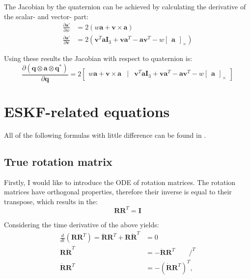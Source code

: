 The Jacobian by the quaternion can be achieved by calculating the derivative of the scalar- and vector- part:
\begin{equation}
\begin{aligned}
    \frac{\partial\mathbf{a}'}{\partial w}&=2(w\mathbf{a}+\mathbf{v}\times\mathbf{a}) \\
    \frac{\partial\mathbf{a}'}{\partial \mathbf{v}}&=2(\mathbf{v}^T\mathbf{a}\mathbf{I}_3+\mathbf{v}\mathbf{a}^T-\mathbf{a}\mathbf{v}^T-w\begin{bmatrix}
        \mathbf{a}
    \end{bmatrix}_\times)
\end{aligned}
\end{equation}

Using these results the Jacobian with respect to quaternion is:
\begin{equation}
    \frac{\partial(\mathbf{q}\otimes\mathbf{a}\otimes\mathbf{q}^*)}{\partial\mathbf{q}}=2\begin{bmatrix}
        w\mathbf{a}+\mathbf{v}\times\mathbf{a} & | & \mathbf{v}^T\mathbf{a}\mathbf{I}_3+\mathbf{v}\mathbf{a}^T-\mathbf{a}\mathbf{v}^T-w\begin{bmatrix} \mathbf{a} \end{bmatrix}_\times
    \end{bmatrix}
\end{equation}

\chapter{ESKF-related equations}
\label{app:error-state-derivation}

All of the following formulas with little difference can be found in \cite{quaternion-eskf}.

\section{True rotation matrix}
\label{app:der-true-rot}

Firstly, I would like to introduce the ODE of rotation matrices. The rotation matrices have orthogonal properties, therefore their inverse is equal to their transpose, which results in the:
\begin{equation}
    \mathbf{R}\mathbf{R}^T=\mathbf{I}
\end{equation}

Considering the time derivative of the above yields:
\begin{equation}
\begin{aligned}
    \frac{d}{dt}(\mathbf{R}\mathbf{R}^T)=\dot{\mathbf{R}}\mathbf{R}^T+\mathbf{R}\dot{\mathbf{R}}^T&=0 \\
    \mathbf{R}\dot{\mathbf{R}}^T&=-\dot{\mathbf{R}}\mathbf{R}^T \qquad /^T \\
    \dot{\mathbf{R}}\mathbf{R}^T&=-(\dot{\mathbf{R}}\mathbf{R}^T)^T,
\end{aligned}
\end{equation}

